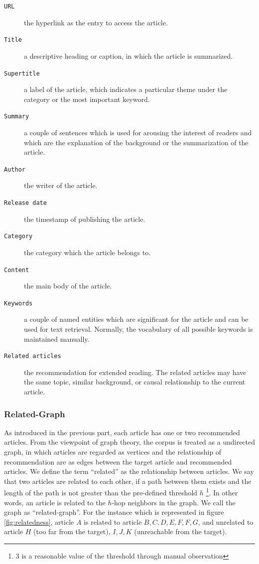 \begin{description}
    \item[\texttt{URL}] the hyperlink as the entry to access the article.

    \item[\texttt{Title}] a descriptive heading or caption, in which the article is summarized.
    \item[\texttt{Supertitle}] a label of the article, which indicates a particular theme under the category or the most important keyword.
    \item[\texttt{Summary}] a couple of sentences which is used for arousing the interest of readers and which are the explanation of the background or the summarization of the article. 
    \item[\texttt{Author}] the writer of the article.
    \item[\texttt{Release date}] the timestamp of publishing the article.
    \item[\texttt{Category}] the category which the article belongs to.
    \item[\texttt{Content}] the main body of the article.
    \item[\texttt{Keywords}] a couple of named entities which are significant for the article and can be used for text retrieval. Normally, the vocabulary of all possible keywords is maintained manually. 
    \item[\texttt{Related articles}] the recommendation for extended reading. The related articles may have the same topic, similar background, or causal relationship to the current article.
        
\end{description}

\subsubsection{Related-Graph}

As introduced in the previous part, each article has one or two recommended articles. From the viewpoint of graph theory, the corpus is treated as a undirected graph, in which articles are regarded as vertices and the relationship of recommendation are as edges between the target article and recommended articles. We define the term ``related'' as the relationship between articles. We say that two articles are related to each other, if a path between them exists and the length of the path is not greater than the pre-defined threshold $h$ \footnote{$3$ is a reasonable value of the threshold through manual observation}. In other words, an article is related to the $h$-hop neighbors in the graph. We call the graph as ``related-graph''. For the instance which is represented in figure \ref{fig:relatedness}, article $A$ is related to article $B, C, D, E, F, F, G$, and unrelated to article $H$ (too far from the target), $I, J, K$ (unreachable from the target). 
 
